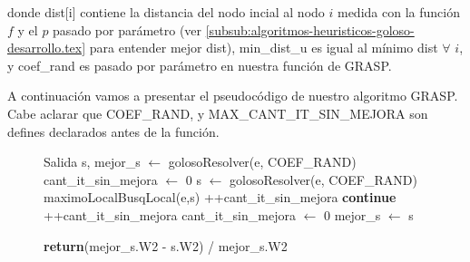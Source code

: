 donde dist[i] contiene la distancia del nodo incial al nodo $i$ medida con la función $f$ y el $p$ pasado por parámetro (ver \ref{subsub:algoritmos-heuristicos-goloso-desarrollo.tex} para entender mejor dist), min\_dist\_u es igual al mínimo dist $\forall$ $i$, y coef\_rand es pasado por parámetro en nuestra función de GRASP.

A continuación vamos a presentar el pseudocódigo de nuestro algoritmo GRASP. Cabe aclarar que COEF\_RAND, y MAX\_CANT\_IT\_SIN\_MEJORA son defines declarados antes de la función.

\begin{center}
 \begin{figure}[H]
  \begin{pseudo}
    \State Salida s, mejor\_s $\leftarrow$ golosoResolver(e, COEF\_RAND)
    \State cant\_it\_sin\_mejora $\leftarrow$ 0   
      \State s $\leftarrow$ golosoResolver(e, COEF\_RAND)
      \State maximoLocalBusqLocal(e,s)
	\State++cant\_it\_sin\_mejora
	\State \textbf{continue}
      \EndIf
	\State ++cant\_it\_sin\_mejora
      \Else
	\State cant\_it\_sin\_mejora $\leftarrow$ 0
      \EndIf
	\State mejor\_s $\leftarrow$ s
      \EndIf
    \EndWhile
    \EndProcedure
  \end{pseudo}
 \end{figure}
\end{center}

\begin{center}
 \begin{figure}[H]
  \begin{pseudo}
    \State \textbf{return}(mejor\_s.W2 - s.W2) / mejor\_s.W2
  \EndProcedure
  \end{pseudo}
 \end{figure}
\end{center}